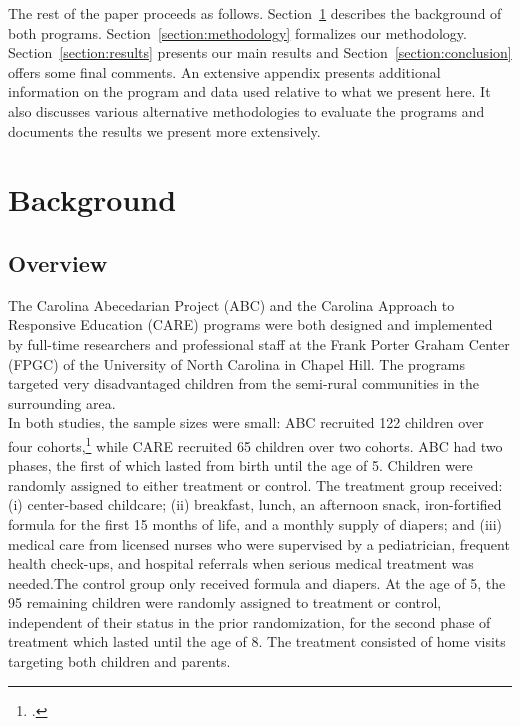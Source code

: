 \noindent The rest of the paper proceeds as follows. Section~\ref{section:background} describes the background of both programs. Section~\ref{section:methodology} formalizes our methodology. Section~\ref{section:results} presents our main results and Section~\ref{section:conclusion} offers some final comments. An extensive appendix presents additional information on the program and data used relative to what we present here. It also discusses various alternative methodologies to evaluate the programs and documents the results we present more extensively. 

\section{Background} \label{section:background}
\subsection{Overview}

\noindent The Carolina Abecedarian Project (ABC) and the Carolina Approach to Responsive Education (CARE) programs were both designed and implemented by full-time researchers and professional staff at the Frank Porter Graham Center (FPGC) of the University of North Carolina in Chapel Hill. The programs targeted very disadvantaged children from the semi-rural communities in the surrounding area.\\

\noindent In both studies, the sample sizes were small: ABC recruited 122 children over four cohorts,\footnote{\citet{Ramey_Collier_etal_1976_CarolinaAbecedarianProject}.} while CARE recruited 65 children over two cohorts. ABC had two phases, the first of which lasted from birth until the age of 5. Children were randomly assigned to either treatment or control. The treatment group received: (i) center-based childcare; (ii) breakfast, lunch, an afternoon snack, iron-fortified formula for the first 15 months of life, and a monthly supply of diapers; and (iii) medical care from licensed nurses who were supervised by a pediatrician, frequent health check-ups, and hospital referrals when serious medical treatment was needed.The control group only received formula and diapers. At the age of 5, the 95 remaining children were randomly assigned to treatment or control, independent of their status in the prior randomization, for the second phase of treatment which lasted until the age of 8. The treatment consisted of home visits targeting both children and parents.\\ 

